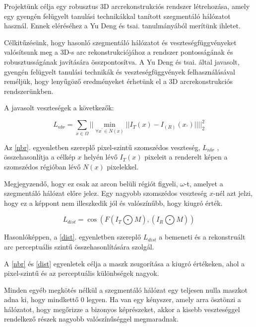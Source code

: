 \documentclass[12pt,a4]{article}
\begin{document}
            Projektünk célja egy robusztus 3D arcrekonstrukciós rendszer létrehozása, amely egy gyengén felügyelt tanulási technikákkal tanított szegmentáló hálózatot használ. Ennek eléréséhez a \cite{focus}Yu Deng és tsai. tanulmányából merítünk ihletet. 

            Célkitűzésünk, hogy hasonló szegmentáló hálózatot és veszteségfüggvényeket valósítsunk meg a 3D-s arc rekonstrukciójához a rendszer pontosságának és robusztusságának javítására összpontosítva. A \cite{focus}Yu Deng és tsai. által javasolt, gyengén felügyelt tanulási technikák és veszteségfüggvények felhasználásával reméljük, hogy lenyűgöző eredményeket érhetünk el a 3D arcrekonstrukciós rendszerünkben.

            A javasolt veszteségek a következők:

            \begin{equation}
                \label{nbr}
                L_{nbr} = \sum_{x \in \Omega}\Big|\Big|\min_{\forall x^{'} \in N(x)}||I_{T}(x)-I_(R)(x_{'})||\Big|\Big|_{2}^{2}
                
            \end{equation}

            Az \ref{nbr}. egyenletben szereplő pixel-szintű szomszédos veszteség, $L_{nbr}$ , összehasonlítja a célkép $x$ helyén lévő $I_{T}(x)$ pixeleit a renderelt képen a szomszédos régióban lévő $N(x)$ pixelekkel. 

            Megjegyzendő, hogy ez csak az arcon belüli régiót figyeli, $\omega$-t, amelyet a szegmentáló hálózat előre jelez. Egy nagyobb szomszédos veszteség $x$-nél azt jelzi, hogy ez a képpont nem illeszkedik jól és valószínűbb, hogy kiugró érték.
                

            \begin{equation}\label{dist}
                L_{dist} = \cos(F(I_{T} \bigodot M),(I_{R} \bigodot M))  
            \end{equation}

            Hasonlóképpen, a \ref{dist}. egyenletben szereplő $L_{dist}$ a bemeneti és a rekonstruált arc perceptuális szintű összehasonlítására szolgál.

            A \ref{nbr} és \ref{dist} egyenletek célja a maszk zsugorítása a kiugró értékeken, ahol a pixel-szintű és az perceptuális különbségek nagyok.

            Minden egyéb megkötés nélkül a szegmentáló hálózat egy teljesen nulla maszkot adna ki, hogy mindkettő 0 legyen. Ha van egy kényszer, amely arra ösztönzi a hálózatot, hogy megőrizze a bizonyos képrészeket, akkor a kisebb veszteséggel rendelkező részek nagyobb valószínűséggel megmaradnak.
\end{document}
